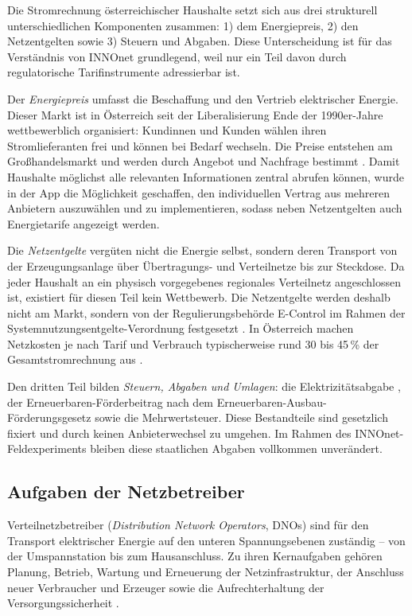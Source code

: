
Die Stromrechnung österreichischer Haushalte setzt sich aus drei strukturell unterschiedlichen Komponenten zusammen: 1) dem Energiepreis, 2) den Netzentgelten sowie 3) Steuern und Abgaben. Diese Unterscheidung ist für das Verständnis von INNOnet grundlegend, weil nur ein Teil davon durch regulatorische Tarifinstrumente adressierbar ist.

Der \textit{Energiepreis} umfasst die Beschaffung und den Vertrieb elektrischer Energie. Dieser Markt ist in Österreich seit der Liberalisierung Ende der 1990er-Jahre wettbewerblich organisiert: Kundinnen und Kunden wählen ihren Stromlieferanten frei und können bei Bedarf wechseln. Die Preise entstehen am Großhandelsmarkt und werden durch Angebot und Nachfrage bestimmt \parencite{econtrolSystemnutzungsentgelte}. Damit Haushalte möglichst alle relevanten Informationen zentral abrufen können, wurde in der App die Möglichkeit geschaffen, den individuellen Vertrag aus mehreren Anbietern auszuwählen und zu implementieren, sodass neben Netzentgelten auch Energietarife angezeigt werden.

Die \textit{Netzentgelte} vergüten nicht die Energie selbst, sondern deren Transport von der Erzeugungsanlage über Übertragungs- und Verteilnetze bis zur Steckdose. Da jeder Haushalt an ein physisch vorgegebenes regionales Verteilnetz angeschlossen ist, existiert für diesen Teil kein Wettbewerb. Die Netzentgelte werden deshalb nicht am Markt, sondern von der Regulierungsbehörde E-Control im Rahmen der Systemnutzungsentgelte-Verordnung festgesetzt \parencite{econtrolSystemnutzungsentgelte}. In Österreich machen Netzkosten je nach Tarif und Verbrauch typischerweise rund 30 bis 45\,\% der Gesamtstromrechnung aus \parencite{acerAnnualReport2022}.

Den dritten Teil bilden \textit{Steuern, Abgaben und Umlagen}: die Elektrizitätsabgabe \parencite{elabgg}, der Erneuerbaren-Förderbeitrag nach dem Erneuerbaren-Ausbau-Förderungsgesetz \parencite{eafg2021} sowie die Mehrwertsteuer. Diese Bestandteile sind gesetzlich fixiert und durch keinen Anbieterwechsel zu umgehen. Im Rahmen des INNOnet-Feldexperiments bleiben diese staatlichen Abgaben vollkommen unverändert.


\subsection{Aufgaben der Netzbetreiber}

Verteilnetzbetreiber (\textit{Distribution Network Operators}, DNOs) sind für den Transport elektrischer Energie auf den unteren Spannungsebenen zuständig -- von der Umspannstation bis zum Hausanschluss. Zu ihren Kernaufgaben gehören Planung, Betrieb, Wartung und Erneuerung der Netzinfrastruktur, der Anschluss neuer Verbraucher und Erzeuger sowie die Aufrechterhaltung der Versorgungssicherheit \parencite{elwog2010}.

